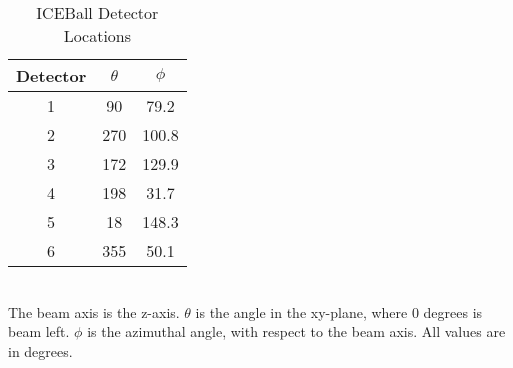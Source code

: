 \begin{table}[tpb]
    \centering
    \caption{ICEBall Detector Locations}
        \label{tab:ICE_Det_Loc}
    \begin{tabular}{c|c|c} \toprule
         Detector & $\theta$ & $\phi$  \\
         \hline
         1 & 90 & 79.2 \\ 
         2 & 270 & 100.8\\
         3 & 172 & 129.9\\
         4 & 198 & 31.7\\
         5 & 18 & 148.3\\
         6 & 355 & 50.1\\ \bottomrule
    \end{tabular}
    \\[2pt]
    \footnotesize
    The beam axis is the z-axis. $\theta$ is the angle in the xy-plane, where 0 degrees is beam left. $\phi$ is the azimuthal angle, with respect to the beam axis. All values are in degrees.
\end{table}